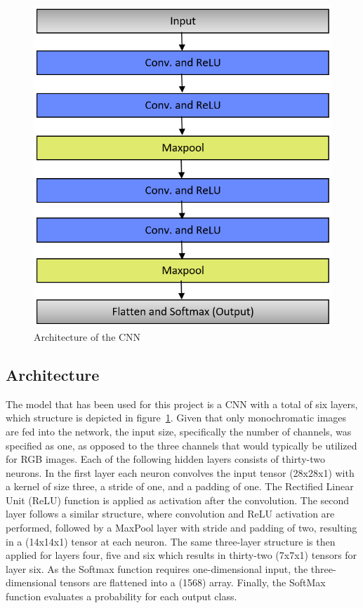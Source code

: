\documentclass[@CLASSOPTIONS@]{tumarticle}
\begin{document}
\begin{figure}
    \begin{minipage}{0.48\textwidth}
     \centering
     \includegraphics[width=.9\linewidth]{figures/CNN_Arch_5}
     \caption{Architecture of the CNN}\label{Fig:CNN_A}
   \end{minipage}
\end{figure}

\subsection{Architecture}

The model that has been used for this project is a CNN with a total of six layers, which structure is depicted in
figure~\ref{Fig:CNN_A}.
Given that only monochromatic images are fed into the network, the input size, specifically the number of channels,
was specified as one, as opposed to the three channels that would typically be utilized for RGB images.
Each of the following hidden layers consists of thirty-two neurons.
In the first layer each neuron convolves the input tensor (28x28x1) with a kernel of size three, a stride of one, and
a padding of one.
The Rectified Linear Unit (ReLU) function is applied as activation after the convolution.
The second layer follows a similar structure, where convolution and ReLU activation are performed, followed by a MaxPool
layer with stride and padding of two, resulting in a (14x14x1) tensor at each neuron.
The same three-layer structure is then applied for layers four, five and six which results in thirty-two (7x7x1) tensors for
layer six.
As the Softmax function requires one-dimensional input, the three-dimensional tensors are flattened into a (1568) array.
Finally, the SoftMax function evaluates a probability for each output class.
\end{document}
